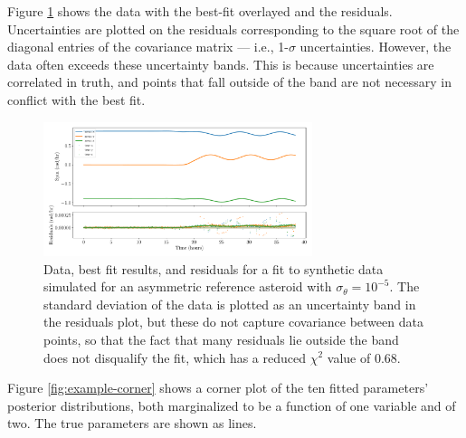 \documentclass{aastex631}
\begin{document}
Figure \ref{fig:example-residuals} shows the data with the best-fit overlayed and the residuals. Uncertainties are plotted on the residuals corresponding to the square root of the diagonal entries of the covariance matrix --- i.e., 1-$\sigma$ uncertainties. However, the data often exceeds these uncertainty bands. This is because uncertainties are correlated in truth, and points that fall outside of the band are not necessary in conflict with the best fit.

\begin{figure}
  \centering
  \includegraphics[width=0.7\textwidth]{example-residuals.pdf}
  \caption{Data, best fit results, and residuals for a fit to synthetic data simulated for an asymmetric reference asteroid with $\sigma_\theta = 10^{-5}$. The standard deviation of the data is plotted as an uncertainty band in the residuals plot, but these do not capture covariance between data points, so that the fact that many residuals lie outside the band does not disqualify the fit, which has a reduced $\chi^2$ value of 0.68.}
  \label{fig:example-residuals}
\end{figure}

Figure \ref{fig:example-corner} shows a corner plot of the ten fitted parameters' posterior distributions, both marginalized to be a function of one variable and of two. The true parameters are shown as lines.
\end{document}
